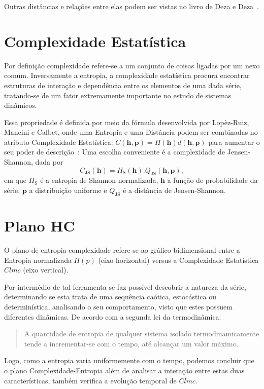 Outras distâncias e relações entre elas podem ser vistas no livro de Deza e Deza~\citep{EncyclopediaofDistances}.

\section{Complexidade Estatística}

Por definição complexidade refere-se a um conjunto de coisas ligadas por um nexo comum. Inversamente a entropia, a complexidade estatística procura encontrar estruturas de interação e dependência entre os elementos de uma dada série, tratando-se de um fator extremamente importante no estudo de sistemas dinâmicos.

Essa propriedade é definida por meio da fórmula desenvolvida por Lopèz-Ruiz, Mancini e Calbet, onde uma Entropia e uma Distância podem ser combinadas no atributo Complexidade Estatística: $C(\bm h, \bm p) = H(\bm h)d(\bm h, \bm p)$ para aumentar o seu poder de descrição~\citep{article5,FELDMAN1998244,LOPEZRUIZ1995321}:
Uma escolha conveniente é a complexidade de Jensen-Shannon, dada por
 \begin{equation}
 C_{\text{JS}}(\bm h) = H_{\text{S}}(\bm h) . Q_{\text{JS}}(\bm h, \bm p),
 \end{equation}
em que $H_{\text{S}}$ é a entropia de Shannon normalizada, $\bm h$ a função de probabilidade da série, $\bm p$ a distribuição uniforme e $Q_{\text{JS}}$ é a distância de Jensen-Shannon.

\section{Plano HC}

 O plano de entropia complexidade refere-se ao gráfico bidimensional entre a Entropia normalizada $H(p)$ (eixo horizontal) versus a Complexidade Estatística $Clmc$ (eixo vertical). 

 Por intermédio de tal ferramenta se faz possível descobrir a natureza da série, determinando se esta trata de uma sequência caótica, estocástica ou determinística, analisando o seu comportamento, visto que estes possuem diferentes dinâmicas. De acordo com a segunda lei da termodinâmica:
 \begin{quote}
A quantidade de entropia de qualquer sistema isolado termodinamicamente tende a incrementar-se com o tempo, até alcançar um valor máximo. 
 \end{quote}

 Logo, como a entropia varia uniformemente com o tempo, podemos concluir que o plano Complexidade-Entropia além de analisar a interação entre estas duas características, também verifica a evolução temporal de $Clmc$.

